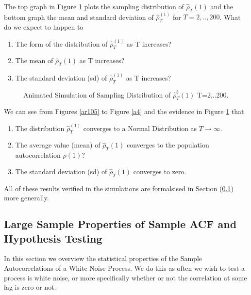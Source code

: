 \documentclass[openany]{tufte-book} %
\begin{document}
The top graph in Figure \ref{arsim}  plots the sampling distribution of  $\hat{\rho}_{T}(1)$ and  the bottom graph the mean and standard deviation of  $\hat{\rho}_{T}^(1)$  for $T=2,..,200$. What do we expect to happen to

\begin{enumerate}
	\item[A] The form of the distribution of  $\hat{\rho}_{T}^(1)$ as T increases?
	\item[B] The mean of $\hat{\rho}_{T}(1)$  as T increases?
	\item[C] The standard deviation (sd) of $\hat{\rho}_{T}^(1)$  as T increases?
\end{enumerate}
\begin{figure} \label{arsim}
 \caption[Simulation Sampling Distribution of Sample ACF of AR(1)]{Animated Simulation of Sampling Distribution of $\hat{\rho}_{T}^{b}(1)$  T=2,..200.}
\end{figure}

We can see from Figures \ref{ar105} to Figure \ref{a4} and the evidence in Figure \ref{arsim} that 
\begin{enumerate}
	\item[A] The distribution  $\hat{\rho}_{T}^(1)$  converges to a Normal Distribution as $T\rightarrow \infty$. 
	\item[B] The average value (mean) of $\hat{\rho}_{T}(1)$  converges to the population autocorrelation $\rho(1)$?
	\item[C] The standard deviation (sd) of $\hat{\rho}_{T}(1)$  converges to zero.
\end{enumerate}
All of these results  verified in the simulations are formalsised in Section (\ref{sec2}) more generally.


\subsection{Large Sample Properties of Sample ACF and Hypothesis Testing}
 \label{sec2}
In this section we overview the statistical properties of the Sample Autocorrelations of a White Noise Process. We do this as often we wish to test a process is white noise, or more specifically whether or not the correlation at some lag is zero or not. 
\end{document}

